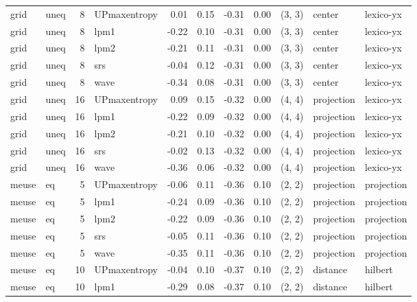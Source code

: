 \begin{tabular}{llrlrrrrlll}
  grid &  uneq &  8 & UPmaxentropy &  0.01 &     0.15 &  -0.31 &       0.00 & (3, 3) &      center &  lexico-yx \\
  grid &  uneq &  8 &         lpm1 & -0.22 &     0.10 &  -0.31 &       0.00 & (3, 3) &      center &  lexico-yx \\
  grid &  uneq &  8 &         lpm2 & -0.21 &     0.11 &  -0.31 &       0.00 & (3, 3) &      center &  lexico-yx \\
  grid &  uneq &  8 &          srs & -0.04 &     0.12 &  -0.31 &       0.00 & (3, 3) &      center &  lexico-yx \\
  grid &  uneq &  8 &         wave & -0.34 &     0.08 &  -0.31 &       0.00 & (3, 3) &      center &  lexico-yx \\
  grid &  uneq & 16 & UPmaxentropy &  0.09 &     0.15 &  -0.32 &       0.00 & (4, 4) &  projection &  lexico-yx \\
  grid &  uneq & 16 &         lpm1 & -0.22 &     0.09 &  -0.32 &       0.00 & (4, 4) &  projection &  lexico-yx \\
  grid &  uneq & 16 &         lpm2 & -0.21 &     0.10 &  -0.32 &       0.00 & (4, 4) &  projection &  lexico-yx \\
  grid &  uneq & 16 &          srs & -0.02 &     0.13 &  -0.32 &       0.00 & (4, 4) &  projection &  lexico-yx \\
  grid &  uneq & 16 &         wave & -0.36 &     0.06 &  -0.32 &       0.00 & (4, 4) &  projection &  lexico-yx \\
 meuse &    eq &  5 & UPmaxentropy & -0.06 &     0.11 &  -0.36 &       0.10 & (2, 2) &  projection & projection \\
 meuse &    eq &  5 &         lpm1 & -0.24 &     0.09 &  -0.36 &       0.10 & (2, 2) &  projection & projection \\
 meuse &    eq &  5 &         lpm2 & -0.22 &     0.09 &  -0.36 &       0.10 & (2, 2) &  projection & projection \\
 meuse &    eq &  5 &          srs & -0.05 &     0.11 &  -0.36 &       0.10 & (2, 2) &  projection & projection \\
 meuse &    eq &  5 &         wave & -0.35 &     0.11 &  -0.36 &       0.10 & (2, 2) &  projection & projection \\
 meuse &    eq & 10 & UPmaxentropy & -0.04 &     0.10 &  -0.37 &       0.10 & (2, 2) &  distance &    hilbert \\
 meuse &    eq & 10 &         lpm1 & -0.29 &     0.08 &  -0.37 &       0.10 & (2, 2) &  distance &    hilbert \\

\end{tabular}
